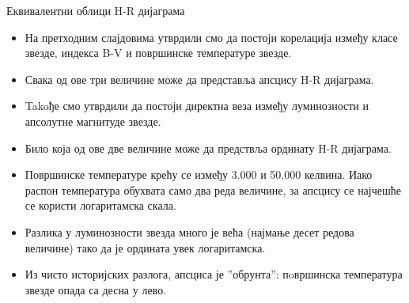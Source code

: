\documentclass[aspectratio=169, xcolor=table, 10pt]{beamer}
\theoremstyle{definition}
\begin{document}
\begin{frame}{Еквивалентни облици H-R дијаграма}
  \begin{itemize}
    \item На претходним слајдовима утврдили смо да постоји корелација између класе звезде, индекса B-V и површинске температуре звезде.
    \item Свака од ове три величине може да представља апсцису H-R дијаграма.
    \item Takoђе смо утврдили да постоји директна веза између луминозности и апсолутне магнитуде звезде.
    \item Било која од ове две величине може да предствља ординату H-R дијаграма.
    \item Површинске температуре крећу се између 3.000 и 50.000 келвина. Иако распон температура обухвата само два реда величине, за апсцису се најчешће се користи логаритамска скала.
    \item Разлика у луминозности звезда много је већа (најмање десет редова величине) тако да је ордината увек логаритамска.
    \item Из чисто историјских разлога, апсциса је ”обрунта”: пoвршинска температура звезде опада са десна у лево.
  \end{itemize}
\end{frame}
\end{document}
